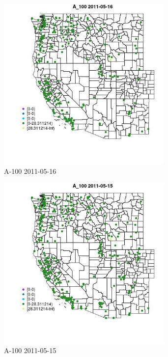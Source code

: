 \clearpage 

\begin{figure} 
\centering  
\includegraphics[width=0.77\textwidth]{Code_Outputs/ML_input_report_ML_input_PM25_Step5_part_d_de_duplicated_aves_ML_input_MapObsA_1002011-05-16.jpg} 
\caption{\label{fig:ML_input_report_ML_input_PM25_Step5_part_d_de_duplicated_aves_ML_inputMapObsA_1002011-05-16}A-100 2011-05-16} 
\end{figure} 
 

\begin{figure} 
\centering  
\includegraphics[width=0.77\textwidth]{Code_Outputs/ML_input_report_ML_input_PM25_Step5_part_d_de_duplicated_aves_ML_input_MapObsA_1002011-05-15.jpg} 
\caption{\label{fig:ML_input_report_ML_input_PM25_Step5_part_d_de_duplicated_aves_ML_inputMapObsA_1002011-05-15}A-100 2011-05-15} 
\end{figure} 
 

